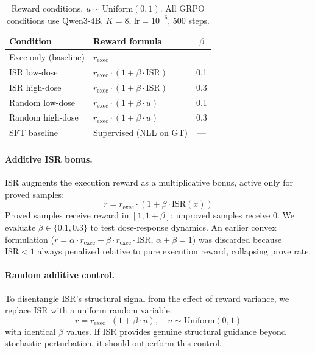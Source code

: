 \begin{table}[t]
\centering
\small
\begin{tabular}{@{}llc@{}}
\toprule
\textbf{Condition} & \textbf{Reward formula} & $\beta$ \\
\midrule
Exec-only (baseline) & $r_{\text{exec}}$ & --- \\
ISR low-dose & $r_{\text{exec}} \cdot (1 + \beta \cdot \text{ISR})$ & 0.1 \\
ISR high-dose & $r_{\text{exec}} \cdot (1 + \beta \cdot \text{ISR})$ & 0.3 \\
Random low-dose & $r_{\text{exec}} \cdot (1 + \beta \cdot u)$ & 0.1 \\
Random high-dose & $r_{\text{exec}} \cdot (1 + \beta \cdot u)$ & 0.3 \\
SFT baseline & Supervised (NLL on GT) & --- \\
\bottomrule
\end{tabular}
\caption{Reward conditions. $u \sim \text{Uniform}(0,1)$. All GRPO conditions use Qwen3-4B, $K{=}8$, lr$=10^{-6}$, 500 steps.}
\label{tab:reward}
\end{table}

\paragraph{Additive ISR bonus.}
ISR augments the execution reward as a multiplicative bonus, active only for proved samples:
\begin{equation}
  r = r_{\text{exec}} \cdot (1 + \beta \cdot \text{ISR}(x))
  \label{eq:additive_isr}
\end{equation}
Proved samples receive reward in $[1, 1{+}\beta]$; unproved samples receive $0$.
We evaluate $\beta \in \{0.1, 0.3\}$ to test dose-response dynamics.
An earlier convex formulation ($r = \alpha \cdot r_{\text{exec}} + \beta \cdot r_{\text{exec}} \cdot \text{ISR}$, $\alpha{+}\beta{=}1$) was discarded because $\text{ISR} < 1$ always penalized relative to pure execution reward, collapsing prove rate.

\paragraph{Random additive control.}
To disentangle ISR's structural signal from the effect of reward variance, we replace ISR with a uniform random variable:
\begin{equation}
  r = r_{\text{exec}} \cdot (1 + \beta \cdot u), \quad u \sim \text{Uniform}(0, 1)
  \label{eq:additive_random}
\end{equation}
with identical $\beta$ values.
If ISR provides genuine structural guidance beyond stochastic perturbation, it should outperform this control.

